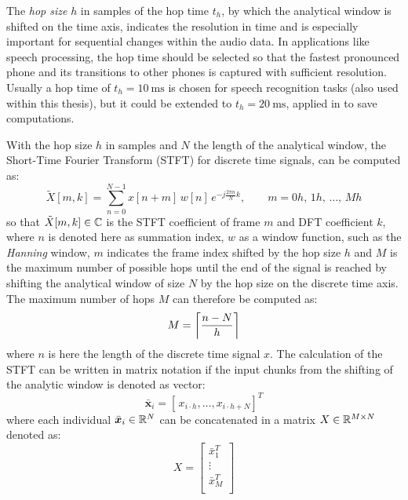 The \emph{hop size} $h$ in samples of the hop time $t_h$, by which the analytical window is shifted on the time axis, indicates the resolution in time and is especially important for sequential changes within the audio data.
In applications like speech processing, the hop time should be selected so that the fastest pronounced phone and its transitions to other phones is captured with sufficient resolution.
Usually a hop time of $t_{h}=\SI{10}{\milli\second}$ is chosen for speech recognition tasks (also used within this thesis), but it could be extended to $t_{h}=\SI{20}{\milli\second}$, applied in \cite{Peter2020} to save computations.

With the hop size $h$ in samples and $N$ the length of the analytical window, the Short-Time Fourier Transform (STFT) for discrete time signals, can be computed as:
\begin{equation}\label{eq:signal_spec_stft}
    \tilde{X}[m, k] = \sum_{n=0}^{N-1} x[n + m] \, w[n] \, e^{-j\frac{2 \pi n}{N}k}, \qquad m = 0 h, \, 1 h, \, \dots, \, M h 
\end{equation}
so that $\tilde{X}[m, k] \in \C$ is the STFT coefficient of frame $m$ and DFT coefficient $k$, where $n$ is denoted here as summation index, $w$ as a window function, such as the \emph{Hanning} window, $m$ indicates the frame index shifted by the hop size $h$ and $M$ is the maximum number of possible hops until the end of the signal is reached by shifting the analytical window of size $N$ by the hop size on the discrete time axis.
The maximum number of hops $M$ can therefore be computed as:
\begin{equation}\label{eq:signal_spec_hop}
  M = \ceil*{\frac{n-N}{h}}
\end{equation}
where $n$ is here the length of the discrete time signal $x$.
The calculation of the STFT can be written in matrix notation if the input chunks from the shifting of the analytic window is denoted as vector:
\begin{equation}
  \bar{\bm{x}}_i = [\, x_{i \cdot h}, \dots, x_{i \cdot h+N}]^T
\end{equation}
where each individual $\bar{\bm{x}}_i \in \R^N$ can be concatenated in a matrix $X \in \R^{M \times N}$ denoted as:
\begin{equation}
  X = 
  \begin{bmatrix}
    \bar{x}_1^T \\
    \vdots\\
    \bar{x}_M^T \\
  \end{bmatrix}
\end{equation}
